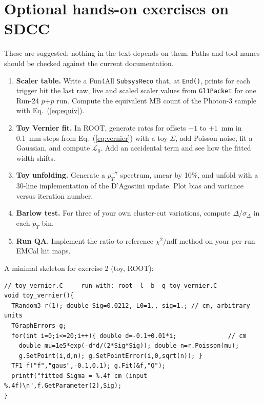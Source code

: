 \documentclass[11pt,letterpaper]{article}
\begin{document}
\section{Optional hands-on exercises on SDCC}
These are suggested; nothing in the text depends on them. Paths and tool names should be checked against the current documentation.
\begin{enumerate}
\item \textbf{Scaler table.} Write a Fun4All \texttt{SubsysReco} that, at \texttt{End()}, prints for each trigger bit the last raw,
live and scaled scaler values from \texttt{Gl1Packet} for one Run-24 $p$+$p$ run. Compute the equivalent MB count of the Photon-3
sample with Eq.~(\ref{eq:equiv}).
\item \textbf{Toy Vernier fit.} In ROOT, generate rates for offsets $-1$ to $+1$~mm in 0.1~mm steps from Eq.~(\ref{eq:vernier}) with a
toy $\Sigma$, add Poisson noise, fit a Gaussian, and compute $\mathcal{L}_0$. Add an accidental term and see how the fitted width shifts.
\item \textbf{Toy unfolding.} Generate a $p_T^{-7}$ spectrum, smear by 10\%, and unfold with a 30-line implementation of the
D'Agostini update. Plot bias and variance versus iteration number.
\item \textbf{Barlow test.} For three of your own cluster-cut variations, compute $\Delta/\sigma_\Delta$ in each $p_T$ bin.
\item \textbf{Run QA.} Implement the ratio-to-reference $\chi^2/\mathrm{ndf}$ method on your per-run EMCal hit maps.
\end{enumerate}
A minimal skeleton for exercise 2 (toy, ROOT):
\begin{verbatim}
// toy_vernier.C  -- run with: root -l -b -q toy_vernier.C
void toy_vernier(){
  TRandom3 r(1); double Sig=0.0212, L0=1., sig=1.; // cm, arbitrary units
  TGraphErrors g;
  for(int i=0;i<=20;i++){ double d=-0.1+0.01*i;              // cm
    double mu=1e5*exp(-d*d/(2*Sig*Sig)); double n=r.Poisson(mu);
    g.SetPoint(i,d,n); g.SetPointError(i,0,sqrt(n)); }
  TF1 f("f","gaus",-0.1,0.1); g.Fit(&f,"Q");
  printf("fitted Sigma = %.4f cm (input %.4f)\n",f.GetParameter(2),Sig);
}
\end{verbatim}

\end{document}
